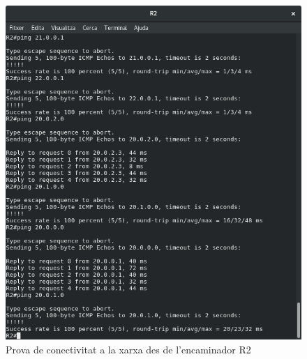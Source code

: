 \documentclass[10pt]{article}
\begin{document}
\begin{figure}[H]
\begin{center}
\includegraphics[scale=0.4]{Images/ospf-R2-conectivity.png}
\caption{Prova de conectivitat a la xarxa des de l'encaminador R2}
\end{center}
\end{figure}
\end{document}
